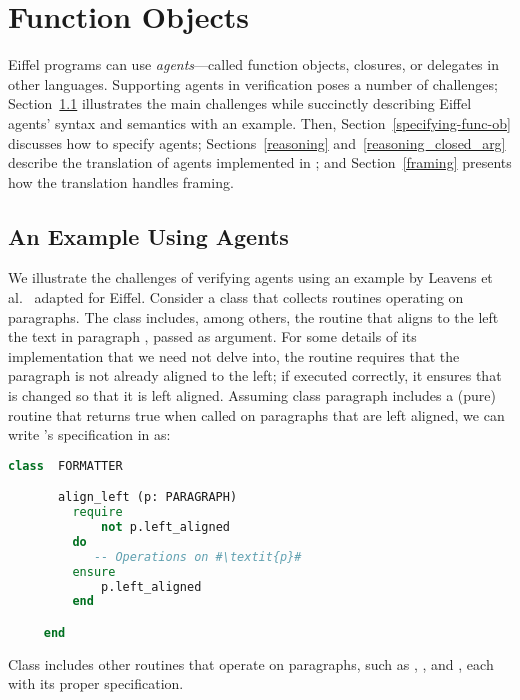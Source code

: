 \section{Function Objects}
\label{sec:m-agents}



Eiffel programs can use \emph{agents}---called function objects, closures, or delegates in other languages.
Supporting agents in verification poses a number of challenges; Section~\ref{formatter-example-intro} illustrates the main challenges while succinctly describing Eiffel agents' syntax and semantics with an example.
Then, Section~\ref{specifying-func-ob} discusses how to specify agents; Sections~\ref{reasoning} and~\ref{reasoning_closed_arg} describe the translation of agents implemented in \AutoProof; and Section~\ref{framing} presents how the translation handles framing.


\subsection{An Example Using Agents}\label{formatter-example-intro}

We illustrate the challenges of verifying agents using an example by Leavens et al.~\cite{LeavensLeinoMueller07} adapted for Eiffel.
Consider a class  that collects routines operating on paragraphs.
The class includes, among others, the routine  that aligns to the left the text in paragraph , passed as argument.
For some details of its implementation that we need not delve into, the routine requires that the paragraph is not already aligned to the left; if executed correctly, it ensures that  is changed so that it is left aligned.
Assuming class paragraph includes a (pure) routine  that returns true when called on paragraphs that are left aligned, we can write 's specification in  as:

\begin{lstlisting}[language=Eiffel, escapechar=\#]
     class  FORMATTER

       align_left (p: PARAGRAPH)      
         require                     
             not p.left_aligned             
         do                          
            -- Operations on #\textit{p}#
         ensure                      
             p.left_aligned
         end

     end
\end{lstlisting}
% 
Class  includes other routines that operate on paragraphs, such as , , and , each with its proper specification.

